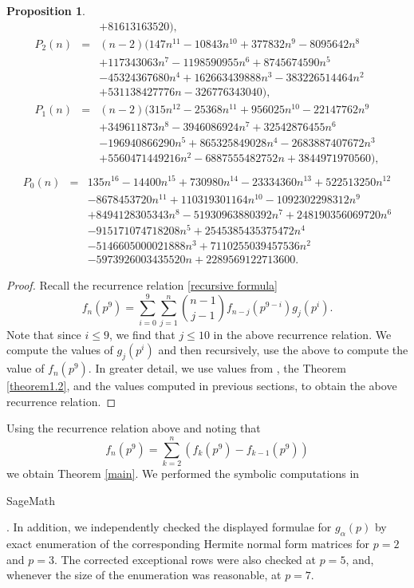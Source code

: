 \documentclass[a4paper]{amsart}
\newtheorem{proposition}[theorem]{Proposition}
\numberwithin{equation}{section}
\theoremstyle{remark}
\begin{document}
\begin{proposition}
\begin{eqnarray*}
    && + 81613163520),\\
    P_2(n) &=& (n - 2)(147n^{11} - 10843n^{10} + 377832n^9 - 8095642n^8\\
    && + 117343063n^7 - 1198590955n^6 + 8745674590n^5\\
    && - 45324367680n^4 + 162663439888n^3 - 383226514464n^2\\
    && + 531138427776n - 326776343040),\\
    P_1(n) &=& (n - 2)(315n^{12} - 25368n^{11} + 956025n^{10} - 22147762n^9\\
    && + 349611873n^8 - 3946086924n^7 + 32542876455n^6\\
    && - 196940866290n^5 + 865325849028n^4 - 2683887407672n^3\\
    && + 5560471449216n^2 - 6887555482752n + 3844971970560),\\
                 \end{eqnarray*}
    \begin{eqnarray*}
    P_0(n) &=& 135 n^{16} - 14400 n^{15} + 730980 n^{14} - 23334360 n^{13} + 522513250 n^{12}\\
    && - 8678453720 n^{11} + 110319301164 n^{10} - 1092302298312 n^9\\
    && + 8494128305343 n^8 - 51930963880392 n^7 + 248190356069720 n^6\\
    && - 915171074718208 n^5  + 2545385435375472 n^4\\
    && - 5146605000021888 n^3 + 7110255039457536 n^2\\
    && - 5973926003435520 n + 2289569122713600.
\end{eqnarray*}
\end{proposition}
\begin{proof}
\par Recall the recurrence relation \eqref{recursive formula}
\[f_n(p^9)=\sum_{i=0}^9\sum_{j=1}^n {n-1\choose j-1} f_{n-j}(p^{9-i})g_j(p^i).\] Note that since $i\leq 9$, we find that $j\leq 10$ in the above recurrence relation. We compute the values of $g_j(p^i)$ and then recursively, use the above to compute the value of $f_n(p^9)$. In greater detail, we use values from \cite[p. 231]{atanasov2021counting}, the Theorem \ref{theorem1.2}, and the values computed in previous sections, to obtain the above recurrence relation.
\end{proof}
Using the recurrence relation above and noting that \[f_n(p^9)=\sum_{k=2}^{n}\left(f_k(p^9)-f_{k-1}(p^9)\right)\]we obtain Theorem \ref{main}. We performed the symbolic computations in \begin{tt}SageMath\end{tt}. In addition, we independently checked the displayed formulae for $g_\alpha(p)$ by exact enumeration of the corresponding Hermite normal form matrices for $p=2$ and $p=3$. The corrected exceptional rows were also checked at $p=5$, and, whenever the size of the enumeration was reasonable, at $p=7$.
\end{document}
